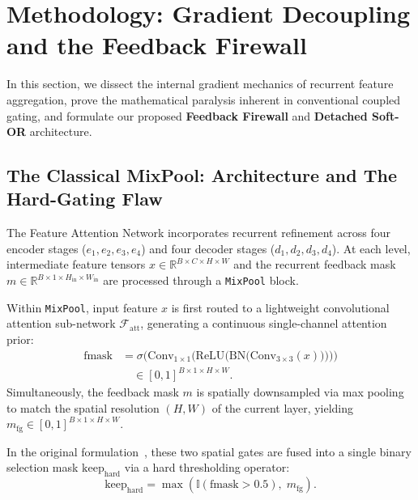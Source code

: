 \section{Methodology: Gradient Decoupling and the Feedback Firewall}
\label{sec:method}

In this section, we dissect the internal gradient mechanics of recurrent
feature aggregation, prove the mathematical paralysis inherent in conventional
coupled gating, and formulate our proposed \textbf{Feedback Firewall}
and \textbf{Detached Soft-OR} architecture.


\subsection{The Classical MixPool: Architecture and The Hard-Gating Flaw}
The Feature Attention Network incorporates recurrent refinement across
four encoder stages ($e_1, e_2, e_3, e_4$) and four decoder stages
($d_1, d_2, d_3, d_4$). At each level, intermediate feature tensors
$x \in \mathbb{R}^{B \times C \times H \times W}$ and the recurrent
feedback mask
$m \in \mathbb{R}^{B \times 1 \times H_{\text{in}} \times W_{\text{in}}}$
are processed through a \texttt{MixPool} block.

Within \texttt{MixPool}, input feature $x$ is first routed to a
lightweight convolutional attention sub-network $\mathcal{F}_{\text{att}}$,
generating a continuous single-channel attention prior:
\begin{equation}
  \label{eq:fmask_def}
  \begin{split}
    \text{fmask} &= \sigma\!\Big(
      \text{Conv}_{1 \times 1}\!\Big(
        \text{ReLU}\!\big(
          \text{BN}\!\big(\text{Conv}_{3 \times 3}(x)\big)
        \big)
      \Big)
    \Big) \\
    &\quad \in [0, 1]^{B \times 1 \times H \times W}.
  \end{split}
\end{equation}
Simultaneously, the feedback mask $m$ is spatially downsampled via max
pooling to match the spatial resolution $(H, W)$ of the current layer,
yielding $m_{\text{fg}} \in [0, 1]^{B \times 1 \times H \times W}$.

In the original formulation~\cite{tomar2021fanet}, these two spatial
gates are fused into a single binary selection mask
$\text{keep}_{\text{hard}}$ via a hard thresholding operator:
\begin{equation}
  \label{eq:keep_hard}
  \text{keep}_{\text{hard}} =
    \max\!\left(\mathbb{I}(\text{fmask} > 0.5),\; m_{\text{fg}}\right).
\end{equation}

